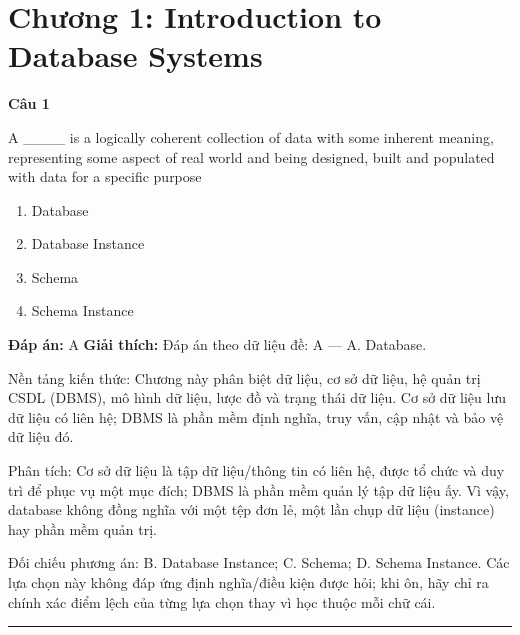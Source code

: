 \documentclass[11pt,a4paper]{article}
\newenvironment{question}[1]{%
  \par\vspace{1em}\noindent\textbf{\large Câu #1}\par\vspace{0.4em}
}{%
  \par\vspace{1em}\hrule\vspace{0.6em}
}
\newenvironment{choices}{%
  \begin{enumerate}[label=\textbf{\Alph*.},leftmargin=2.2em,itemsep=2pt,topsep=3pt]
}{%
  \end{enumerate}
}
\newcommand{\choice}{\item}
\begin{document}
\newpage
\section*{Chương 1: Introduction to Database Systems}

\begin{question}{1}
A ____ is a logically coherent collection of data with some inherent meaning, representing some aspect of real world and being designed, built and populated with data for a specific purpose
\begin{choices}
\choice Database
\choice Database Instance
\choice Schema
\choice Schema Instance
\end{choices}
\textbf{Đáp án:} A
\textbf{Giải thích:} Đáp án theo dữ liệu đề: A — A. Database.

Nền tảng kiến thức: Chương này phân biệt dữ liệu, cơ sở dữ liệu, hệ quản trị CSDL (DBMS), mô hình dữ liệu, lược đồ và trạng thái dữ liệu. Cơ sở dữ liệu lưu dữ liệu có liên hệ; DBMS là phần mềm định nghĩa, truy vấn, cập nhật và bảo vệ dữ liệu đó.

Phân tích: Cơ sở dữ liệu là tập dữ liệu/thông tin có liên hệ, được tổ chức và duy trì để phục vụ một mục đích; DBMS là phần mềm quản lý tập dữ liệu ấy. Vì vậy, database không đồng nghĩa với một tệp đơn lẻ, một lần chụp dữ liệu (instance) hay phần mềm quản trị.

Đối chiếu phương án: B. Database Instance; C. Schema; D. Schema Instance. Các lựa chọn này không đáp ứng định nghĩa/điều kiện được hỏi; khi ôn, hãy chỉ ra chính xác điểm lệch của từng lựa chọn thay vì học thuộc mỗi chữ cái.
\end{question}
\end{document}
